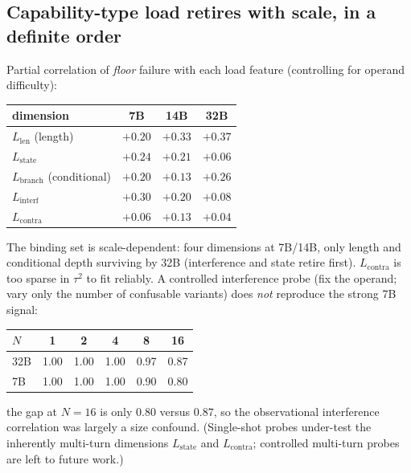 \subsection{Capability-type load retires with scale, in a definite order}\label{sec:results-load}%
Partial correlation of \emph{floor} failure with each load feature (controlling for operand difficulty):
\begin{center}\small\begin{tabular}{lccc}
\toprule dimension & 7B & 14B & 32B \\ \midrule
$L_{\mathrm{len}}$ (length) & $+0.20$ & $+0.33$ & $\mathbf{+0.37}$ \\
$L_{\mathrm{state}}$ & $\mathbf{+0.24}$ & $\mathbf{+0.21}$ & $+0.06$ \\
$L_{\mathrm{branch}}$ (conditional) & $+0.20$ & $+0.13$ & $\mathbf{+0.26}$ \\
$L_{\mathrm{interf}}$ & $\mathbf{+0.30}$ & $\mathbf{+0.20}$ & $+0.08$ \\
$L_{\mathrm{contra}}$ & $+0.06$ & $+0.13$ & $+0.04$ \\ \bottomrule
\end{tabular}\end{center}
The binding set is scale-dependent: four dimensions at 7B/14B, only length and conditional depth surviving by 32B (interference and state retire first). $L_{\mathrm{contra}}$ is too sparse in $\tau^2$ to fit reliably. A controlled interference probe (fix the operand; vary only the number of confusable variants) does \emph{not} reproduce the strong 7B signal:
\begin{center}\small\begin{tabular}{lccccc}
\toprule $N$ & 1 & 2 & 4 & 8 & 16 \\ \midrule
32B & 1.00 & 1.00 & 1.00 & 0.97 & 0.87 \\
7B  & 1.00 & 1.00 & 1.00 & 0.90 & 0.80 \\ \bottomrule
\end{tabular}\end{center}
the gap at $N=16$ is only $0.80$ versus $0.87$, so the observational interference correlation was largely a size confound. (Single-shot probes under-test the inherently multi-turn dimensions $L_{\mathrm{state}}$ and $L_{\mathrm{contra}}$; controlled multi-turn probes are left to future work.)

